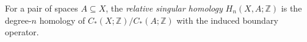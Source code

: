 
For a pair of spaces $A\subseteq X$, the \emph{relative singular homology} $H_n(X,A;\mathbb Z)$ is the degree-$n$ homology of $C_*(X;\mathbb Z)/C_*(A;\mathbb Z)$ with the induced boundary operator.
